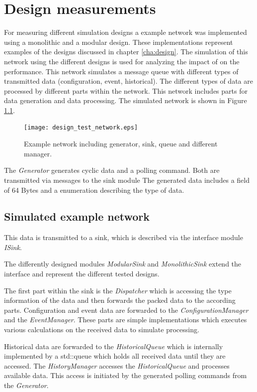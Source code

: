 \chapter{Design measurements}
\label{cha:measurements}
For measuring different simulation designs a example network was implemented using a monolithic and a modular design.
These implementations represent examples of the designs discussed in chapter \ref{cha:design}.
The simulation of this network using the different designs is used for analyzing the impact of on the performance.
This network simulates a message queue with different types of transmitted data (configuration, event, historical).
The different types of data are processed by different parts within the network.
This network includes parts for data generation and data processing.
The simulated network is shown in Figure \ref{fig:design_test_network}.

\begin{figure}
    \centering
    \texttt{[image: design\_test\_network.eps]}
    \caption{Example network including generator, sink, queue and different manager.}
    \label{fig:design_test_network}
\end{figure}

The \emph{Generator} generates cyclic data and a polling command.
Both are transmitted via messages to the sink module
The generated data includes a field of 64 Bytes and a enumeration describing the type of data.

\section{Simulated example network}
\label{sec:measurements_network}
This data is transmitted to a sink, which is described via the interface module \emph{ISink}.

The differently designed modules \emph{ModularSink} and \emph{MonolithicSink} extend the interface and represent the different tested designs.

The first part within the sink is the \emph{Dispatcher} which is accessing the type information of the data and then forwards the packed data to the according parts.
Configuration and event data are forwarded to the \emph{ConfigurationManager} and the \emph{EventManager}.
These parts are simple implementations which executes various calculations on the received data to simulate processing.

Historical data are forwarded to the \emph{HistoricalQueue} which is internally implemented by a std::queue which holds all received data until they are accessed.
The \emph{HistoryManager} accesses the \emph{HistoricalQueue} and processes available data.
This access is initiated by the generated polling commands from the \emph{Generator}.
\\

